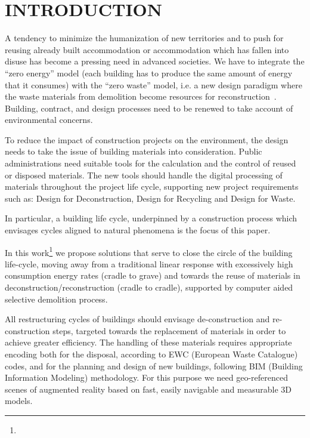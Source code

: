 \documentclass[a4paper,twoside]{article}
\begin{document}
%
\section{\uppercase{Introduction}}
\label{sec:introduction}

\noindent
A tendency to minimize the humanization of new territories and to push for reusing already  built accommodation or accommodation which has fallen into disuse has become a pressing need in advanced societies. We have to integrate the ``zero energy'' model (each building has to produce the same amount of energy that it consumes) with the ``zero waste'' model, i.e. a new design paradigm where the waste materials from demolition become resources for reconstruction~\cite{altamura:12}. Building, contract, and design processes need to be renewed to take account of environmental concerns. 

To reduce the impact of construction projects on the environment, the design needs to take the issue of building materials into consideration. Public administrations need suitable tools for the calculation and the control of reused or disposed materials. The new tools should handle the digital processing of materials throughout the project life cycle, supporting new project requirements such as: Design for Deconstruction, Design for Recycling and Design for Waste. 

In particular, a building life cycle, underpinned by a construction process which envisages cycles aligned to natural phenomena is the focus of this paper. 

In this work\footnote{\acks} we propose solutions that serve to close the circle of the building life-cycle, moving away from a traditional linear response with excessively high consumption energy rates (cradle to grave) and towards the reuse of materials in deconstruction/reconstruction (cradle to cradle), supported by computer aided selective demolition process.

All restructuring cycles of buildings should envisage de-construction and re-construction steps, targeted towards the replacement of materials in order to achieve greater efficiency. The handling of these materials requires appropriate encoding both for the disposal, according to EWC (European Waste Catalogue) codes, and for the planning and design of new buildings, following BIM (Building Information Modeling) methodology. For this purpose we need geo-referenced scenes of augmented reality based on fast, easily navigable and measurable 3D models. 
\end{document}
